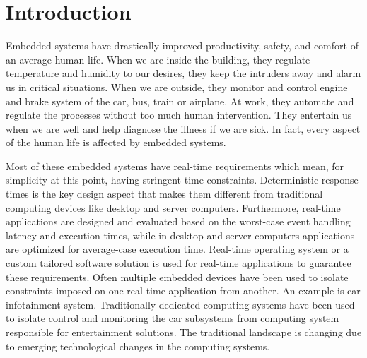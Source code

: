 
\newcommand\moreslaw{Law states that number of transistors on a chip doubles approximately every two years}
\newcommand\IoT{A trend that aims to connect everything to the cloud}
\newcommand\industry{A trend that aims to enable machine to machine communication and connecting machines to cloud}

\chapter{Introduction \label{chap1}}

Embedded systems have drastically improved productivity, safety, and comfort of an average human life.
When we are inside the building, they regulate temperature and humidity to our desires, 
they keep the intruders away and alarm us in critical situations. 
When we are outside, they monitor and control engine and brake system of the car, bus, train or airplane.
At work, they automate and regulate the processes without too much human intervention.
They entertain us when we are well and help diagnose the illness if we are sick.
In fact, every aspect of the human life is affected by embedded systems.

Most of these embedded systems have real-time requirements which mean, for simplicity at this point, having stringent time constraints.
Deterministic response times is the key design aspect
that makes them different from traditional computing devices like desktop and server computers.
Furthermore, real-time applications are designed and evaluated based on the worst-case event handling latency and execution times, while
in desktop and server computers applications are optimized for average-case execution time.
Real-time operating system or a custom tailored software solution is used for real-time applications to guarantee these requirements. 
Often multiple embedded devices have been used to isolate constraints imposed on one real-time application from another.
An example is car infotainment system. Traditionally dedicated computing systems have been used to isolate 
control and monitoring the car subsystems from computing system responsible for entertainment solutions.
The traditional landscape is changing due to emerging technological changes in the computing systems.


